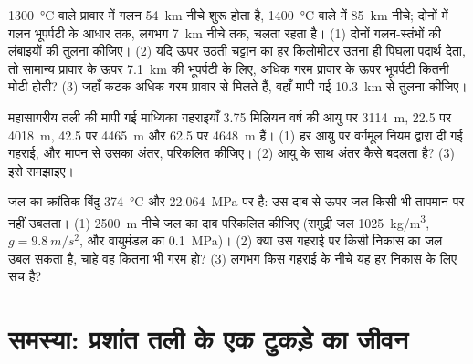 \begin{exercise}[$\star\star\star$]\label{exo:g11:ocean-ridges:13}
\qty{1300}{\celsius} वाले प्रावार में गलन \qty{54}{km} नीचे शुरू होता है,
\qty{1400}{\celsius} वाले में \qty{85}{km} नीचे; दोनों में गलन
भूपर्पटी के आधार तक, लगभग \qty{7}{km} नीचे तक, चलता रहता है। (1) दोनों गलन-स्तंभों की
लंबाइयों की तुलना कीजिए। (2) यदि ऊपर उठती चट्टान का हर किलोमीटर उतना ही
पिघला पदार्थ देता, तो सामान्य प्रावार के ऊपर \qty{7.1}{km} की भूपर्पटी के लिए, अधिक गरम प्रावार के ऊपर
भूपर्पटी कितनी मोटी होती? (3) जहाँ कटक अधिक गरम प्रावार से मिलते हैं, वहाँ मापी गई
\qty{10.3}{km} से तुलना कीजिए।
\end{exercise}

\begin{exercise}[$\star\star\star$]\label{exo:g11:ocean-ridges:14}
महासागरीय तली की मापी गई माध्यिका गहराइयाँ \num{3.75} मिलियन वर्ष की आयु पर \qty{3114}{m},
\num{22.5} पर \qty{4018}{m}, \num{42.5} पर \qty{4465}{m}
और \num{62.5} पर \qty{4648}{m} हैं। (1) हर आयु पर वर्गमूल नियम द्वारा दी गई
गहराई, और मापन से उसका अंतर, परिकलित कीजिए। (2)
आयु के साथ अंतर कैसे बदलता है? (3) इसे समझाइए।
\end{exercise}

\begin{exercise}[$\star\star\star$]\label{exo:g11:ocean-ridges:15}
जल का क्रांतिक बिंदु \qty{374}{\celsius} और \qty{22.064}{MPa} पर है: उस दाब से
ऊपर जल किसी भी तापमान पर नहीं उबलता। (1) \qty{2500}{m} नीचे जल का
दाब परिकलित कीजिए (समुद्री जल \qty{1025}{kg/m^3},
$g = \qty{9.8}{m/s^2}$, और वायुमंडल का \qty{0.1}{MPa})। (2) क्या उस गहराई पर किसी निकास का
जल उबल सकता है, चाहे वह कितना भी गरम हो? (3) लगभग किस
गहराई के नीचे यह हर निकास के लिए सच है?
\end{exercise}

\section{समस्या: प्रशांत तली के एक टुकड़े का जीवन}

